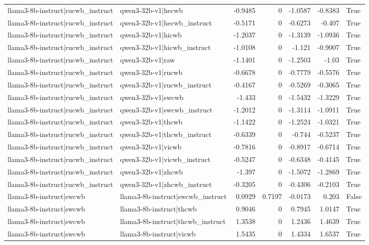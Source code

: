 \begin{table}
\begin{tabular}{l l r r r r l}
llama3-8b-instruct|rucwb_instruct & qwen3-32b-v1|hecwb & -0.9485 & 0 & -1.0587 & -0.8383 & True \\
llama3-8b-instruct|rucwb_instruct & qwen3-32b-v1|hecwb_instruct & -0.5171 & 0 & -0.6273 & -0.407 & True \\
llama3-8b-instruct|rucwb_instruct & qwen3-32b-v1|hicwb & -1.2037 & 0 & -1.3139 & -1.0936 & True \\
llama3-8b-instruct|rucwb_instruct & qwen3-32b-v1|hicwb_instruct & -1.0108 & 0 & -1.121 & -0.9007 & True \\
llama3-8b-instruct|rucwb_instruct & qwen3-32b-v1|raw & -1.1401 & 0 & -1.2503 & -1.03 & True \\
llama3-8b-instruct|rucwb_instruct & qwen3-32b-v1|rucwb & -0.6678 & 0 & -0.7779 & -0.5576 & True \\
llama3-8b-instruct|rucwb_instruct & qwen3-32b-v1|rucwb_instruct & -0.4167 & 0 & -0.5269 & -0.3065 & True \\
llama3-8b-instruct|rucwb_instruct & qwen3-32b-v1|swcwb & -1.433 & 0 & -1.5432 & -1.3229 & True \\
llama3-8b-instruct|rucwb_instruct & qwen3-32b-v1|swcwb_instruct & -1.2012 & 0 & -1.3114 & -1.0911 & True \\
llama3-8b-instruct|rucwb_instruct & qwen3-32b-v1|thcwb & -1.1422 & 0 & -1.2524 & -1.0321 & True \\
llama3-8b-instruct|rucwb_instruct & qwen3-32b-v1|thcwb_instruct & -0.6339 & 0 & -0.744 & -0.5237 & True \\
llama3-8b-instruct|rucwb_instruct & qwen3-32b-v1|vicwb & -0.7816 & 0 & -0.8917 & -0.6714 & True \\
llama3-8b-instruct|rucwb_instruct & qwen3-32b-v1|vicwb_instruct & -0.5247 & 0 & -0.6348 & -0.4145 & True \\
llama3-8b-instruct|rucwb_instruct & qwen3-32b-v1|zhcwb & -1.397 & 0 & -1.5072 & -1.2869 & True \\
llama3-8b-instruct|rucwb_instruct & qwen3-32b-v1|zhcwb_instruct & -0.3205 & 0 & -0.4306 & -0.2103 & True \\
llama3-8b-instruct|swcwb & llama3-8b-instruct|swcwb_instruct & 0.0929 & 0.7197 & -0.0173 & 0.203 & False \\
llama3-8b-instruct|swcwb & llama3-8b-instruct|thcwb & 0.9046 & 0 & 0.7945 & 1.0147 & True \\
llama3-8b-instruct|swcwb & llama3-8b-instruct|thcwb_instruct & 1.3538 & 0 & 1.2436 & 1.4639 & True \\
llama3-8b-instruct|swcwb & llama3-8b-instruct|vicwb & 1.5435 & 0 & 1.4334 & 1.6537 & True \\

\end{tabular}
\end{table}
